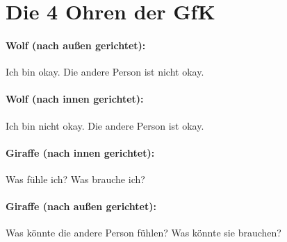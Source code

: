\section{Die 4 Ohren der GfK}

\paragraph{Wolf (nach außen gerichtet):} Ich bin okay. Die andere Person ist nicht okay.

\paragraph{Wolf (nach innen gerichtet):} Ich bin nicht okay. Die andere Person ist okay.

\paragraph{Giraffe (nach innen gerichtet):} Was fühle ich? Was brauche ich?

\paragraph{Giraffe (nach außen gerichtet):} Was könnte die andere Person fühlen? Was könnte sie brauchen?
